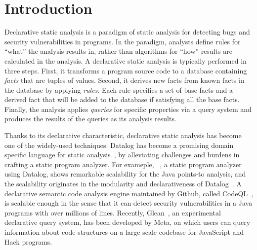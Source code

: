 \section{Introduction}

Declarative static analysis is a paradigm of static analysis for detecting bugs
and security vulnerabilities in programs.
In the paradigm, analysts define rules for ``what'' the analysis results in,
rather than algorithms for ``how'' results are calculated in the analysis.
A declarative static analysis is typically performed in three steps.
First, it transforms a program source code to a database containing
\textit{facts} that are tuples of values. 
Second, it derives new facts from known facts in the database by applying {\it
rules}. 
Each rule specifies a set of base facts and a derived fact that will be added
to the database if satisfying all the base facts.
Finally, the analysis applies {\it queries} for specific properties via a query
system and produces the results of the queries as its analysis results.

Thanks to its declarative characteristic, declarative static analysis has
become one of the widely-used techniques.
Datalog has become a promising domain specific language for static
analysis~\cite{doop, allen2015D, allen2015stagedD, alpuente2010D, dawson1996D,
naik2006D, reps1994D, smaragdakis2014D, whaley2005D, scholz2016}, by
alleviating challenges and burdens in crafting a static program analyzer.
For exameple, \doop~\cite{doop}, a static program analyzer using Datalog, shows
remarkable scalability for the Java points-to analysis, and the scalability
originates in the modularity and declarativeness of
Datalog~\cite{doopWorkshop}.
A declarative semantic code analysis engine maintained by Github, called
CodeQL~\cite{codeql}, is scalable enough in the sense that it can detect
security vulnerabilities in a Java programs with over millions of lines.
Recently, Glean~\cite{glean}, an experimental declarative query system, has
been developed by Meta, on which users can query information about code
structures on a large-scale codebase for JavaScript and Hack programs.

